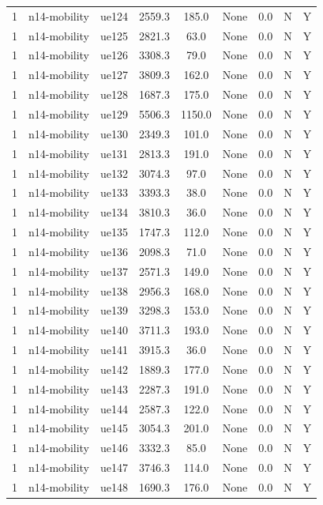\begin{table}[ht]
\begin{tabular}{|c|c|c|c|c|c|c|c|c|}
1 & n14-mobility & ue124 & 2559.3 & 185.0 & None & 0.0 & N & Y \\
1 & n14-mobility & ue125 & 2821.3 & 63.0 & None & 0.0 & N & Y \\
1 & n14-mobility & ue126 & 3308.3 & 79.0 & None & 0.0 & N & Y \\
1 & n14-mobility & ue127 & 3809.3 & 162.0 & None & 0.0 & N & Y \\
1 & n14-mobility & ue128 & 1687.3 & 175.0 & None & 0.0 & N & Y \\
1 & n14-mobility & ue129 & 5506.3 & 1150.0 & None & 0.0 & N & Y \\
1 & n14-mobility & ue130 & 2349.3 & 101.0 & None & 0.0 & N & Y \\
1 & n14-mobility & ue131 & 2813.3 & 191.0 & None & 0.0 & N & Y \\
1 & n14-mobility & ue132 & 3074.3 & 97.0 & None & 0.0 & N & Y \\
1 & n14-mobility & ue133 & 3393.3 & 38.0 & None & 0.0 & N & Y \\
1 & n14-mobility & ue134 & 3810.3 & 36.0 & None & 0.0 & N & Y \\
1 & n14-mobility & ue135 & 1747.3 & 112.0 & None & 0.0 & N & Y \\
1 & n14-mobility & ue136 & 2098.3 & 71.0 & None & 0.0 & N & Y \\
1 & n14-mobility & ue137 & 2571.3 & 149.0 & None & 0.0 & N & Y \\
1 & n14-mobility & ue138 & 2956.3 & 168.0 & None & 0.0 & N & Y \\
1 & n14-mobility & ue139 & 3298.3 & 153.0 & None & 0.0 & N & Y \\
1 & n14-mobility & ue140 & 3711.3 & 193.0 & None & 0.0 & N & Y \\
1 & n14-mobility & ue141 & 3915.3 & 36.0 & None & 0.0 & N & Y \\
1 & n14-mobility & ue142 & 1889.3 & 177.0 & None & 0.0 & N & Y \\
1 & n14-mobility & ue143 & 2287.3 & 191.0 & None & 0.0 & N & Y \\
1 & n14-mobility & ue144 & 2587.3 & 122.0 & None & 0.0 & N & Y \\
1 & n14-mobility & ue145 & 3054.3 & 201.0 & None & 0.0 & N & Y \\
1 & n14-mobility & ue146 & 3332.3 & 85.0 & None & 0.0 & N & Y \\
1 & n14-mobility & ue147 & 3746.3 & 114.0 & None & 0.0 & N & Y \\
1 & n14-mobility & ue148 & 1690.3 & 176.0 & None & 0.0 & N & Y \\

\end{tabular}
\end{table}
